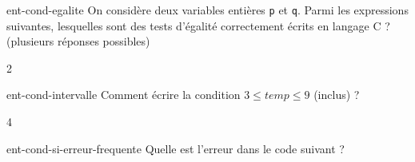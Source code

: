 
\begin{questionmult}{ent-cond-egalite}
    On considère deux variables entières \texttt{p} et \texttt{q}. Parmi les expressions suivantes, lesquelles sont des tests d'égalité correctement écrits en langage C ? (plusieurs réponses possibles)
    \begin{multicols}{2}
        \begin{reponses}
        \end{reponses}
    \end{multicols}
\end{questionmult}

\begin{question}{ent-cond-intervalle}
    Comment écrire la condition \(3 \le temp \le 9\) (inclus) ?
    \begin{multicols}{4}
        \begin{reponses}
        \end{reponses}
    \end{multicols}
\end{question}

\begin{question}{ent-cond-si-erreur-frequente}
    Quelle est l'erreur dans le code suivant ?
    
\end{question}

